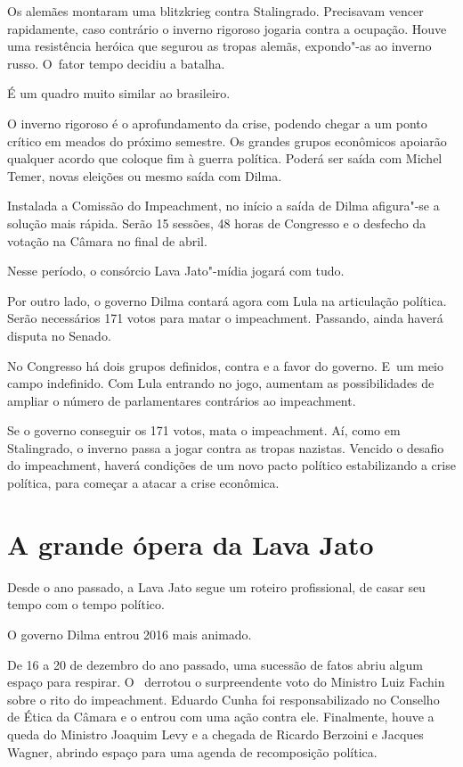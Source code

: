  

Os alemães montaram uma blitzkrieg contra Stalingrado. Precisavam vencer
rapidamente, caso contrário o inverno rigoroso jogaria contra a
ocupação. Houve uma resistência heróica que segurou as tropas alemãs,
expondo"-as ao inverno russo. O~fator tempo decidiu a batalha.

É um quadro muito similar ao brasileiro.

O inverno rigoroso é o aprofundamento da crise, podendo chegar a um
ponto crítico em meados do próximo semestre. Os grandes grupos
econômicos apoiarão qualquer acordo que coloque fim à guerra política.
Poderá ser saída com Michel Temer, novas eleições ou mesmo saída com
Dilma.

Instalada a Comissão do Impeachment, no início a saída de Dilma
afigura"-se a solução mais rápida. Serão 15 sessões, 48 horas de
Congresso e o desfecho da votação na Câmara no final de abril.

Nesse período, o consórcio Lava Jato"-mídia jogará com tudo.

Por outro lado, o governo Dilma contará agora com Lula na articulação
política. Serão necessários 171 votos para matar o impeachment.
Passando, ainda haverá disputa no Senado.

No Congresso há dois grupos definidos, contra e a favor do governo. E~um
meio campo indefinido. Com Lula entrando no jogo, aumentam as
possibilidades de ampliar o número de parlamentares contrários ao
impeachment.

Se o governo conseguir os 171 votos, mata o impeachment. Aí, como em
Stalingrado, o inverno passa a jogar contra as tropas nazistas. Vencido
o desafio do impeachment, haverá condições de um novo pacto político
estabilizando a crise política, para começar a atacar a crise econômica.

\section{A grande ópera da Lava Jato}

Desde o ano passado, a Lava Jato segue um roteiro profissional, de casar
seu tempo com o tempo político.

O governo Dilma entrou 2016 mais animado.

De 16 a 20 de dezembro do ano passado, uma sucessão de fatos abriu algum
espaço para respirar. O~ derrotou o surpreendente voto do Ministro
Luiz Fachin sobre o rito do impeachment. Eduardo Cunha foi
responsabilizado no Conselho de Ética da Câmara e o  entrou com uma
ação contra ele. Finalmente, houve a queda do Ministro Joaquim Levy e a
chegada de Ricardo Berzoini e Jacques Wagner, abrindo espaço para uma
agenda de recomposição política.

